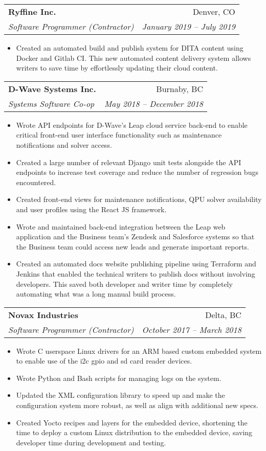 \documentclass[letterpaper,11pt]{article}
\makeatletter
\newcommand{\resumeItem}[2]{
  \item\small{
    \textbf{#1}{#2 \vspace{-2pt}}
  }
}
\newcommand{\resumeSubheading}[4]{
  \vspace{-1pt}\item
    \begin{tabular*}{0.97\textwidth}[t]{l@{\extracolsep{\fill}}r}
      \textbf{#1} & #2 \\
      \textit{\small#3} & \textit{\small #4} \\
    \end{tabular*}\vspace{-5pt}
}
\newcommand{\resumeItemListStart}{\begin{itemize}}
\newcommand{\resumeItemListEnd}{\end{itemize}\vspace{-5pt}}
\makeatother
\begin{document}
    \resumeSubheading
      {Ryffine Inc.}{Denver, CO}
      {Software Programmer (Contractor)}{January 2019 -- July 2019}
      \resumeItemListStart
        \resumeItem{} {Created an automated build and publish system for DITA content using Docker and Gitlab CI. This new automated content delivery system allows writers to save time by effortlessly updating their cloud content.}
      \resumeItemListEnd

    \resumeSubheading
      {D-Wave Systems Inc.}{Burnaby, BC}
      {Systems Software Co-op}{May 2018 -- December 2018}
      \resumeItemListStart
        \resumeItem{} {Wrote API endpoints for D-Wave's Leap cloud service back-end to enable critical front-end user interface functionality such as maintenance notifications and solver access.}
        \resumeItem{} {Created a large number of relevant Django unit tests alongside the API endpoints to increase test coverage and reduce the number of regression bugs encountered.}
        \resumeItem{} {Created front-end views for maintenance notifications, QPU solver availability and user profiles using the React JS framework.}
        \resumeItem{} {Wrote and maintained back-end integration between the Leap web application and the Business team's Zendesk and Salesforce systems so that the Business team could access new leads and generate important reports.}
        \resumeItem{} {Created an automated docs website publishing pipeline using Terraform and Jenkins that enabled the technical writers to publish docs without involving developers. This saved both developer and writer time by completely automating what was a long manual build process.}
      \resumeItemListEnd

    \resumeSubheading
      {Novax Industries}{Delta, BC}
      {Software Programmer (Contractor)}{October 2017 -- March 2018}
      \resumeItemListStart
        \resumeItem{} {Wrote C userspace Linux drivers for an ARM based custom embedded system to enable use of the i2c gpio and sd card reader devices.}
        \resumeItem{} {Wrote Python and Bash scripts for managing logs on the system.}
        \resumeItem{} {Updated the XML configuration library to speed up and make the configuration system more robust, as well as align with additional new specs.}
        \resumeItem{} {Created Yocto recipes and layers for the embedded device, shortening the time to deploy a custom Linux distribution to the embedded device, saving developer time during development and testing.}
      \resumeItemListEnd
\end{document}
